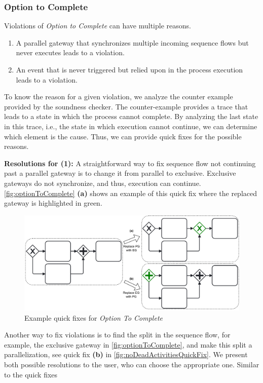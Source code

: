 \documentclass[runningheads]{llncs}
\begin{document}
\subsubsection{Option to Complete} \label{subsec:optionToComplete}
Violations of \textit{Option to Complete} can have multiple reasons.

\begin{enumerate}
	\item A parallel gateway that synchronizes multiple incoming sequence flows but never executes leads to a violation.
	\item An event that is never triggered but relied upon in the process execution leads to a violation.
\end{enumerate}

To know the reason for a given violation, we analyze the counter example provided by the soundness checker.
The counter-example provides a trace that leads to a state in which the process cannot complete.
By analyzing the last state in this trace, i.e., the state in which execution cannot continue, we can determine which element is the cause.
Thus, we can provide quick fixes for the possible reasons.

\textbf{Resolutions for (1):} A straightforward way to fix sequence flow not continuing past a parallel gateway is to change it from parallel to exclusive.
Exclusive gateways do not synchronize, and thus, execution can continue.
\autoref{fig:optionToComplete} \textbf{(a)} shows an example of this quick fix where the replaced gateway is highlighted in green.

\begin{figure}[ht]
	\centering
	\includegraphics[width=1\textwidth]{images/optionToComplete}
	\caption{Example quick fixes for \textit{Option To Complete}}
	\label{fig:optionToComplete}
\end{figure}

Another way to fix violations is to find the split in the sequence flow, for example, the exclusive gateway in \autoref{fig:optionToComplete}, and make this split a parallelization, see quick fix \textbf{(b)} in \autoref{fig:noDeadActivitiesQuickFix}.
We present both possible resolutions to the user, who can choose the appropriate one.
Similar to the quick fixes
\end{document}
